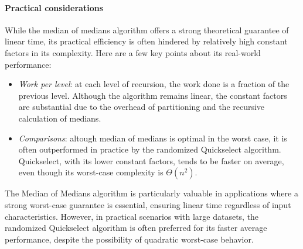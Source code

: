 \paragraph*{Practical considerations}
While the median of medians algorithm offers a strong theoretical guarantee of linear time, its practical efficiency is often hindered by relatively high constant factors in its complexity. 
Here are a few key points about its real-world performance:
\begin{itemize}
    \item \textit{Work per level}: at each level of recursion, the work done is a fraction of the previous level. 
        Although the algorithm remains linear, the constant factors are substantial due to the overhead of partitioning and the recursive calculation of medians.
    \item \textit{Comparisons}: altough median of medians is optimal in the worst case, it is often outperformed in practice by the randomized Quickselect algorithm. 
        Quickselect, with its lower constant factors, tends to be faster on average, even though its worst-case complexity is $\Theta(n^2)$. 
\end{itemize}
The Median of Medians algorithm is particularly valuable in applications where a strong worst-case guarantee is essential, ensuring linear time regardless of input characteristics. 
However, in practical scenarios with large datasets, the randomized Quickselect algorithm is often preferred for its faster average performance, despite the possibility of quadratic worst-case behavior.